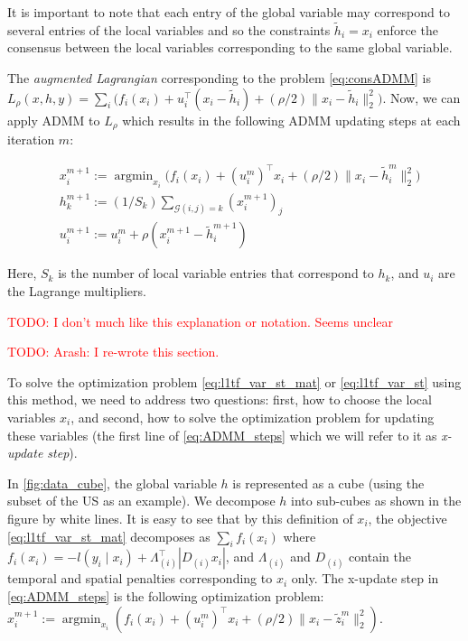 \documentclass{article}
\DeclareMathOperator*{\argmin}{argmin}
\newcommand{\attn}[1]{\textcolor{red}{TODO: #1}}
\newcommand{\given}{\;\vert\;}
\begin{document}
It is important to note that each entry of the global variable may correspond to several entries of the local variables and so the constraints $\tilde{h}_i=x_i$ enforce the consensus between the local variables corresponding to the same global variable. 

The \textit{augmented Lagrangian} corresponding to the problem \ref{eq:consADMM} is $L_\rho(x,h,y)=\sum_i \big(f_i(x_i)+u_i^\top(x_i-\tilde{h}_i) + (\rho/2) \lVert x_i-\tilde{h}_i \lVert_2^2 \big)$. Now, we can apply ADMM to $L_\rho$ which results in the following ADMM updating steps at each iteration $m$:

\begin{equation}
\begin{aligned}
& x_i^{m+1}:=\argmin_{x_i} \bigg( f_i(x_i) + (u_i^m)^\top x_i + (\rho/2) \lVert x_i-\tilde{h}_i^m \lVert_2^2\bigg)\\
& h_k^{m+1}:=(1/S_k)\sum_{\mathscr{G}(i,j)=k} (x_i^{m+1})_j\\
& u_i^{m+1}:=u_i^m + \rho (x_i^{m+1}-\tilde{h}_i^{m+1})
\end{aligned}
\label{eq:ADMM_steps}
\end{equation}

Here, $S_k$ is the number of local variable entries that correspond to
$h_k$, and $u_i$ are the Lagrange multipliers.  

\attn{I don't much like this explanation or notation. Seems unclear}

\attn{Arash: I re-wrote this section.}

To solve the optimization problem \eqref{eq:l1tf_var_st_mat} or
\eqref{eq:l1tf_var_st} using this method, we need to address two
questions: first, how to choose the 
local variables $x_i$, and second, how to solve the optimization
problem for updating these variables (the first line of
\eqref{eq:ADMM_steps} which we will refer to it as \textit{x-update step}).  

In \autoref{fig:data_cube}, the global variable $h$ is represented
as a cube (using the subset of the US as an example). We decompose $h$
into sub-cubes as shown in the figure by white lines. It is easy to see
that by this definition of $x_i$, the objective
\eqref{eq:l1tf_var_st_mat} decomposes as $\sum_i f_i(x_i)$ where
$f_i(x_i)=-l(y_i\given x_i)+\Lambda_{(i)}^\top |D_{(i)}x_i|$, and
$\Lambda_{(i)}$ and $D_{(i)}$ contain the temporal and spatial
penalties corresponding to $x_i$ only. The x-update step in \autoref{eq:ADMM_steps} is the following optimization problem: $x_i^{m+1}:=\argmin_{x_i} ( f_i(x_i) +
(u_i^m)^\top x_i + (\rho/2) \lVert x_i-\tilde{z}_i^m \lVert_2^2)$.
\end{document}
